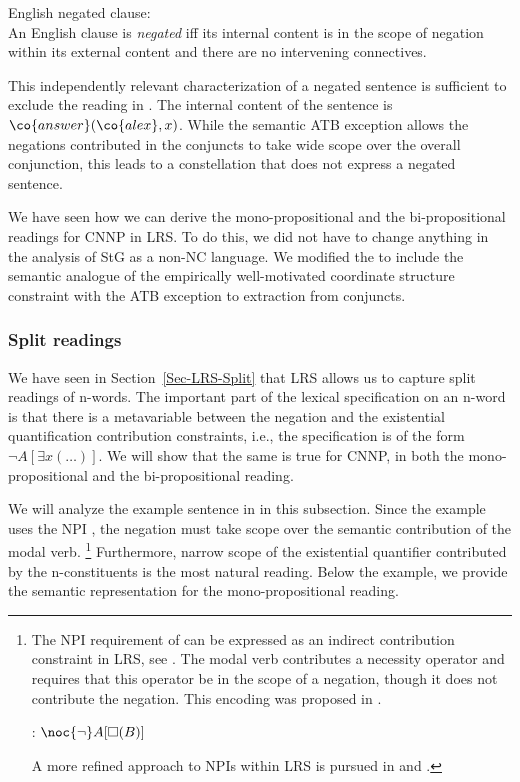 \documentclass[output=paper]{langsci/langscibook}
\begin{document}
\ea English negated clause:\label{def-negatedclause}\\
An English clause is \emph{negated} iff its internal content is in the scope of negation within its external content and there are no intervening connectives.
\z 

This independently relevant characterization of a negated sentence is sufficient to exclude the reading in . 
The internal content of the sentence is $\co{answer}(\co{alex},x)$. 
While the semantic ATB exception allows the negations contributed in the conjuncts to take wide scope over the overall conjunction, this leads to a constellation that does not express a negated sentence.

We have seen how we can derive the mono-propositional and the bi-pro\-po\-si\-tional readings for CNNP in LRS. 
To do this, we did not have to change anything in the analysis of StG as a non-NC language. We modified the \SemATB{} to include the semantic analogue of the empirically well-motivated coordinate structure constraint with the ATB exception to extraction from conjuncts. 

\subsubsection{Split readings}
\label{Sec-AnalysisSplitReadings}

We have seen in Section~\ref{Sec-LRS-Split} that LRS allows us to capture split readings of n-words. The important part of the lexical specification on an n-word is that there is a metavariable between the negation and the existential quantification contribution constraints, i.e., the specification is of the form $\lnot A[\exists x (\ldots)]$. We will show that the same is true for CNNP, in both the mono-propositional and the bi-propositional reading.

We will analyze the example sentence in  in this subsection. Since the example uses the NPI , the negation must take scope over the semantic contribution of the modal verb.%
\footnote{The NPI requirement of  can be expressed as an indirect contribution constraint in LRS, see .
The modal verb contributes a necessity operator and requires that this operator be in the scope of a negation, though it does not contribute the negation.
This encoding was proposed in \citet{Penn:Richter:05}.

\ea \label{le-brauchen}
: $\noc{\lnot}A[\Box(B)]$
\z 

A more refined approach to NPIs within LRS is pursued in \citet{Richter:Soehn:06} and \citet{Sailer:habil}.}
Furthermore, narrow scope of the existential quantifier contributed by the n-constituents is the most natural reading. 
Below the example, we provide the semantic representation for the mono-propositional  reading.
\end{document}
